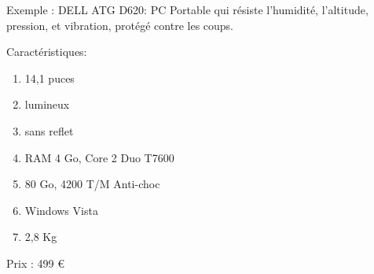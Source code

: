 Exemple : DELL ATG D620: PC Portable qui résiste l'humidité, l'altitude,
pression, et vibration, protégé contre les coups.
	
	Caractéristiques:

	\begin{enumerate} \item 14,1 puces \item lumineux \item sans reflet
	\item RAM 4 Go, Core 2 Duo T7600 \item 80 Go, 4200 T/M Anti-choc
	\item Windows Vista \item 2,8 Kg \end{enumerate}

Prix : 499 \euro 
